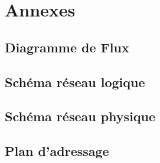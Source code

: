 \documentclass[a4paper,12pt]{report}
\begin{document}
    \chapter*{Annexes}
        \section{Diagramme de Flux}
        \section{Schéma réseau logique}
        \section{Schéma réseau physique}
        \section{Plan d'adressage}
        
\end{document}
